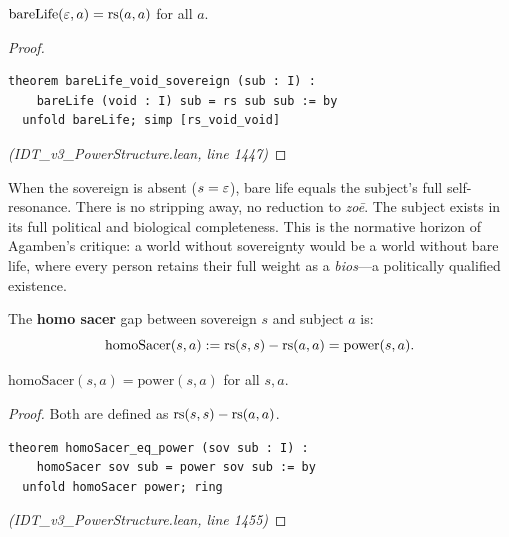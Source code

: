 \begin{theorem}
\label{thm:bare-life-void}
$\mathrm{bareLife}(\varepsilon, a) = \mathrm{rs}(a, a)$ for all $a$.
\end{theorem}

\begin{proof}
\begin{lstlisting}
theorem bareLife_void_sovereign (sub : I) :
    bareLife (void : I) sub = rs sub sub := by
  unfold bareLife; simp [rs_void_void]
\end{lstlisting}
\textit{(IDT\_v3\_PowerStructure.lean, line 1447)}
\end{proof}

\begin{interpretation}
When the sovereign is absent ($s = \varepsilon$), bare life equals the subject's
full self-resonance. There is no stripping away, no reduction to \emph{zoē}.
The subject exists in its full political and biological completeness. This is
the normative horizon of Agamben's critique: a world without sovereignty would
be a world without bare life, where every person retains their full weight
as a \emph{bios}---a politically qualified existence.
\end{interpretation}

\begin{definition}
\label{def:homo-sacer}
The \textbf{homo sacer} gap between sovereign $s$ and subject $a$ is:
\[
  \mathrm{homoSacer}(s, a) := \mathrm{rs}(s, s) - \mathrm{rs}(a, a) = \mathrm{power}(s, a).
\]
\end{definition}

\begin{theorem}
\label{thm:homo-sacer-power}
$\mathrm{homoSacer}(s, a) = \mathrm{power}(s, a)$ for all $s, a$.
\end{theorem}

\begin{proof}
Both are defined as $\mathrm{rs}(s,s) - \mathrm{rs}(a,a)$.
\begin{lstlisting}
theorem homoSacer_eq_power (sov sub : I) :
    homoSacer sov sub = power sov sub := by
  unfold homoSacer power; ring
\end{lstlisting}
\textit{(IDT\_v3\_PowerStructure.lean, line 1455)}
\end{proof}

